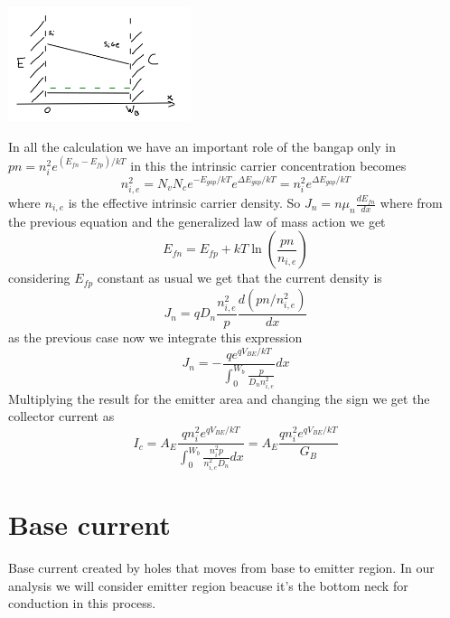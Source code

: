 \centering
\includegraphics[width=0.4\textwidth]{bjt6.png}\\
\raggedright

In all the calculation we have an important role of the bangap only in $pn=n_i^2e^{(E_{fn}-E_{fp})/kT}$ in this the intrinsic carrier concentration becomes
\begin{equation}
n_{i,e}^2=N_vN_ce^{-E_{gap}/kT}e^{\Delta E_{gap}/kT}=n_i^2e^{\Delta E_{gap}/kT}
\end{equation}
where $n_{i,e}$ is the effective intrinsic carrier density. 
So $J_n=n\mu_n \frac{dE_{fn}}{dx}$ where from the previous equation and the generalized law of mass action we get 
\begin{equation}
E_{fn}=E_{fp}+kT\ln(\frac{pn}{n_{i,e}})
\end{equation}
considering $E_{fp}$ constant as usual we get that the current density is 
\begin{equation}
J_n=qD_n \frac{n_{i,e}^2}{p}\frac{d(pn/n_{i,e}^2)}{dx}
\end{equation}
as the previous case now we integrate this expression 
\begin{equation}
J_n=-\frac{qe^{qV_{BE}/kT}}{\int^{W_b}_0 \frac{p}{D_nn_{i,e}^2}}dx
\end{equation}
Multiplying the result for the emitter area and changing the sign we get the collector current as 
\begin{equation}
I_c=A_E \frac{qn_i^2 e^{qV_{BE}/kT}}{\int^{W_{b}}_0\frac{n_i^2p}{n_{i,e}^2D_n}dx}=A_E \frac{qn_i^2 e^{qV_{BE}/kT}}{G_B}
\end{equation}


\section{Base current}

Base current created by holes that moves from base to emitter region. In our analysis we will consider emitter region beacuse it's the bottom neck for conduction in this process.


